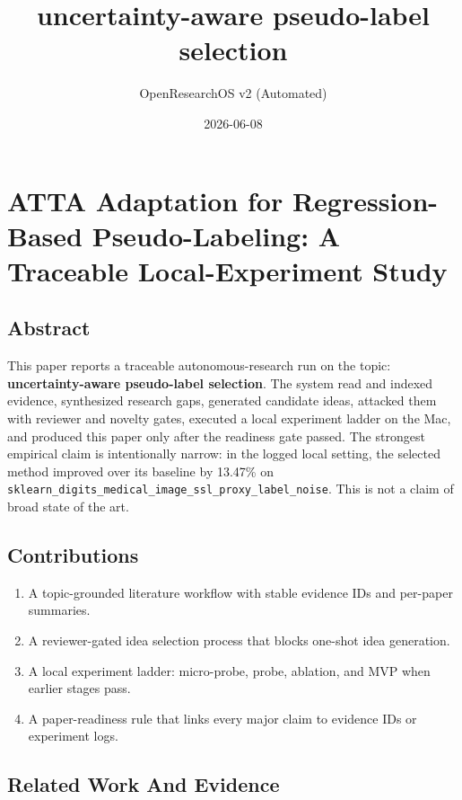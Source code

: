 \documentclass[
  11pt,
]{article}
\title{uncertainty-aware pseudo-label selection}
\author{OpenResearchOS v2 (Automated)}
\date{2026-06-08}
\providecommand{\tightlist}{%
  \setlength{\itemsep}{0pt}\setlength{\parskip}{0pt}}
\begin{document}
\maketitle

\section{ATTA Adaptation for Regression-Based Pseudo-Labeling: A Traceable Local-Experiment Study}\label{atta-adaptation-for-regression-based-pseudo-labeling-a-traceable-local-experiment-study}

\subsection{Abstract}\label{abstract}

This paper reports a traceable autonomous-research run on the topic: \textbf{uncertainty-aware pseudo-label selection}. The system read and indexed evidence, synthesized research gaps, generated candidate ideas, attacked them with reviewer and novelty gates, executed a local experiment ladder on the Mac, and produced this paper only after the readiness gate passed. The strongest empirical claim is intentionally narrow: in the logged local setting, the selected method improved over its baseline by 13.47\% on \texttt{sklearn\_digits\_medical\_image\_ssl\_proxy\_label\_noise}. This is not a claim of broad state of the art.

\subsection{Contributions}\label{contributions}

\begin{enumerate}
\def\labelenumi{\arabic{enumi}.}
\tightlist
\item
  A topic-grounded literature workflow with stable evidence IDs and per-paper summaries.
\item
  A reviewer-gated idea selection process that blocks one-shot idea generation.
\item
  A local experiment ladder: micro-probe, probe, ablation, and MVP when earlier stages pass.
\item
  A paper-readiness rule that links every major claim to evidence IDs or experiment logs.
\end{enumerate}

\subsection{Related Work And Evidence}\label{related-work-and-evidence}
\end{document}
